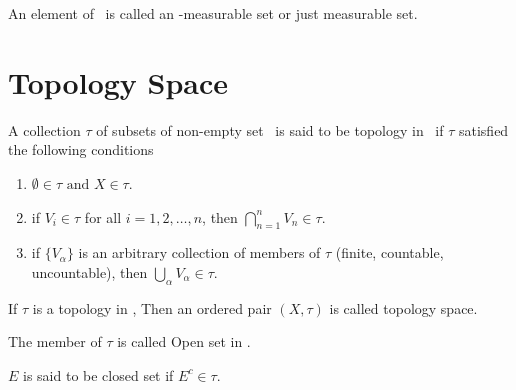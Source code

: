 \begin{definition}
    An element of \A\ is called an \A-measurable set or just measurable set.
\end{definition}

\section{Topology Space}

\begin{definition}[Topology]
    A collection $\tau$ of subsets of non-empty set \XX\ is said to be topology in \XX\ if $\tau$ satisfied the following conditions
    \begin{enumerate}
        \item $\emptyset \in \tau \text{ and }X\in \tau$.
        \item if $V_i\in\tau$  for all $i=1,2,\ldots,n$, then $\bigcap_{n=1}^n V_n\in\tau$.
        \item if $\{V_\alpha\}$ is an arbitrary collection of members of $\tau$ (finite, countable, uncountable), then $\bigcup_\alpha V_\alpha\in \tau$.
    \end{enumerate}
\end{definition}

\begin{definition}
    If $\tau$ is a topology in \XX, Then an ordered pair  $(X,\tau)$ is called topology space.
\end{definition}

\begin{definition}
    The member of $\tau$ is called Open set in \XX.
\end{definition}

\begin{definition}
    $E$ is said to be closed  set if  $E^c\in\tau$.
\end{definition}




